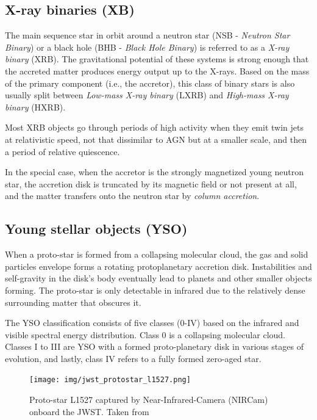 \subsection{X-ray binaries (XB)}
    The main sequence star in orbit around a neutron star (NSB - \emph{Neutron Star Binary}) or a black hole (BHB - \emph{Black Hole Binary}) is referred to as a \emph{X-ray binary} (XRB). The gravitational potential of these systems is strong enough that the accreted matter produces energy output up to the X-rays. Based on the mass of the primary component (i.e., the accretor), this class of binary stars is also usually split between \emph{Low-mass X-ray binary} (LXRB) and \emph{High-mass X-ray binary} (HXRB). 

    Most XRB objects go through periods of high activity when they emit twin jets at relativistic speed, not that dissimilar to AGN but at a smaller scale, and then a period of relative quiescence.

    In the special case, when the accretor is the strongly magnetized young neutron star, the accretion disk is truncated by its magnetic field or not present at all, and the matter transfers onto the neutron star by \emph{column accretion}.


\subsection{Young stellar objects (YSO)}
    When a proto-star is formed from a collapsing molecular cloud, the gas and solid particles envelope forms a rotating protoplanetary accretion disk. Instabilities and self-gravity in the disk's body eventually lead to planets and other smaller objects forming. The proto-star is only detectable in infrared due to the relatively dense surrounding matter that obscures it. 

    The YSO classification consists of five classes (0-IV) based on the infrared and visible spectral energy distribution. Class 0 is a collapsing molecular cloud. Classes I to III are YSO with a formed proto-planetary disk in various stages of evolution, and lastly, class IV refers to a fully formed zero-aged star. 

    \begin{figure}[h]
        \centering
        \texttt{[image: img/jwst\_protostar\_l1527.png]}
        \caption{Proto-star L1527 captured by Near-Infrared-Camera (NIRCam) onboard the JWST. Taken from \cite{nasa_img_l1527}}
        \label{fig:jwst_protostar_l1527}
    \end{figure}


